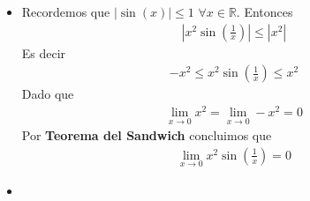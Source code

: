 \documentclass[12pt]{book}
\begin{document}
\begin{itemize}
    \item[\textbf{d)}] Recordemos que $|\sin(x)| \leq 1 $ $\forall x \in \mathbb{R}$. Entonces
    \begin{align*}
       \left| x^2 \sin\left(\frac{1}{x}\right) \right|\leq |x^2|
    \end{align*}
    Es decir
    \begin{align*}
        -x^2\leq x^2 \sin\left(\frac{1}{x}\right) \leq x^2 
    \end{align*}
    Dado que 
    \begin{align*}
        \lim_{x\to 0}x^2=\lim_{x\to 0}-x^2=0
    \end{align*}
Por \textbf{Teorema del Sandwich} concluimos que 
\begin{align*}
    \lim_{x \to 0} x^2 \sin\left(\frac{1}{x}\right)=0
\end{align*}


    \item[\textbf{f)}] 
    
\end{itemize}
\end{document}
